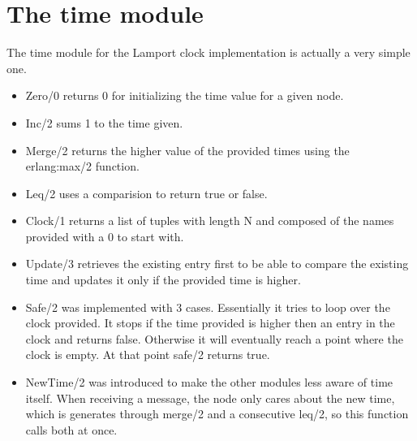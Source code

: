 \documentclass[a4paper, 11pt]{article}
\begin{document}
\section{The time module}
The time module for the Lamport clock implementation is actually a very simple one.
\begin{itemize}
\item Zero/0 returns 0 for initializing the time value for a given node.
\item Inc/2 sums 1 to the time given.
\item Merge/2 returns the higher value of the provided times using the erlang:max/2 function.
\item Leq/2 uses a comparision to return true or false.
\item Clock/1 returns a list of tuples with length N and composed of the names provided with a 0 to start with.
\item Update/3 retrieves the existing entry first to be able to compare the existing time and updates it only if the provided time is higher.
\item Safe/2 was implemented with 3 cases. Essentially it tries to loop over the clock provided. It stops if the time provided is  higher then an entry in the clock and returns false. Otherwise it will eventually reach a point where the clock is empty. At that point safe/2 returns true.
\item NewTime/2 was introduced to make the other modules less aware of time itself. When receiving a message, the node only cares about the new time, which is generates through merge/2 and a consecutive leq/2, so this function calls both at once.
\end{itemize}
\end{document}
